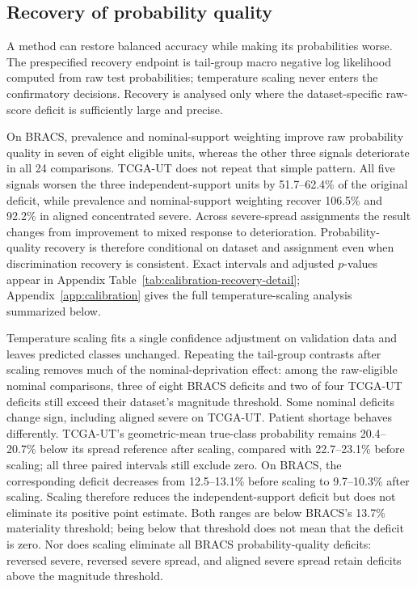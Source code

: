 \documentclass[11pt]{article}
\newcommand{\resultstable}[1]{}
\begin{document}
\subsection{Recovery of probability quality}
\label{sec:rq2-calibration}
A method can restore balanced accuracy while making its probabilities worse. The prespecified recovery endpoint is tail-group macro negative log likelihood computed from raw test probabilities; temperature scaling never enters the confirmatory decisions. Recovery is analysed only where the dataset-specific raw-score deficit is sufficiently large and precise.

\begin{table}[ht]
  \centering
  \small
  \resultstable{calibration_recovery_summary}
  \caption{Recovery of tail-group probability quality. Recovery is the percentage of the original negative-log-likelihood deficit.}
  \label{tab:calibration-recovery}
\end{table}

\noindent On BRACS, prevalence and nominal-support weighting improve raw probability quality in seven of eight eligible units, whereas the other three signals deteriorate in all \num{24} comparisons. TCGA-UT does not repeat that simple pattern. All five signals worsen the three independent-support units by \num{51.7}--\num{62.4}\% of the original deficit, while prevalence and nominal-support weighting recover \num{106.5}\% and \num{92.2}\% in aligned concentrated severe. Across severe-spread assignments the result changes from improvement to mixed response to deterioration. Probability-quality recovery is therefore conditional on dataset and assignment even when discrimination recovery is consistent. Exact intervals and adjusted $p$-values appear in Appendix Table~\ref{tab:calibration-recovery-detail}; Appendix~\ref{app:calibration} gives the full temperature-scaling analysis summarized below.

Temperature scaling fits a single confidence adjustment on validation data and leaves predicted classes unchanged. Repeating the tail-group contrasts after scaling removes much of the nominal-deprivation effect: among the raw-eligible nominal comparisons, three of eight BRACS deficits and two of four TCGA-UT deficits still exceed their dataset's magnitude threshold. Some nominal deficits change sign, including aligned severe on TCGA-UT. Patient shortage behaves differently. TCGA-UT's geometric-mean true-class probability remains \num{20.4}--\num{20.7}\% below its spread reference after scaling, compared with \num{22.7}--\num{23.1}\% before scaling; all three paired intervals still exclude zero. On BRACS, the corresponding deficit decreases from \num{12.5}--\num{13.1}\% before scaling to \num{9.7}--\num{10.3}\% after scaling. Scaling therefore reduces the independent-support deficit but does not eliminate its positive point estimate. Both ranges are below BRACS's \num{13.7}\% materiality threshold; being below that threshold does not mean that the deficit is zero. Nor does scaling eliminate all BRACS probability-quality deficits: reversed severe, reversed severe spread, and aligned severe spread retain deficits above the magnitude threshold.
\end{document}
